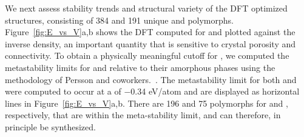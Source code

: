 %
%
We next assess stability trends and structural variety of the DFT optimized structures, consisting of 384 and 191 unique \IrOtwo and \IrOthree polymorphs.
%
Figure~\ref{fig:E_vs_V}a,b shows the DFT computed \DHf for \IrOtwo and \IrOthree plotted against the inverse density,
an important quantity that is sensitive to crystal porosity and connectivity.
%
To obtain a physically meaningful cutoff for \DHf, we computed the metastability limits for \IrOtwo and \IrOthree relative to their amorphous phases using the methodology of Persson and coworkers.~\cite{Aykol2018}.
%
The metastability limit for both \IrOtwo and \IrOthree were computed to occur at a \DHf of \num{-0.34} eV/atom and are displayed as horizontal lines in Figure~\ref{fig:E_vs_V}a,b.
%
There are \num{196} and \num{75} polymorphs for \IrOtwo and \IrOthree, respectively, that are within the meta-stability limit, and can therefore, in principle be synthesized.
%
%


